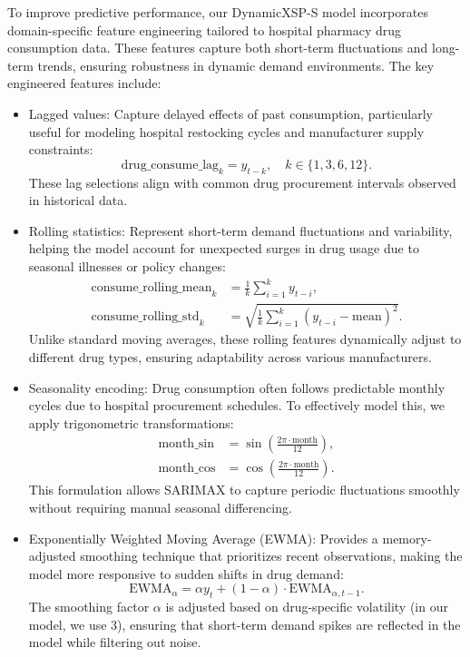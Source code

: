 \documentclass[journal]{IEEEtran}
\begin{document}
To improve predictive performance, our DynamicXSP-S model incorporates domain-specific feature engineering tailored to hospital pharmacy drug consumption data. These features capture both short-term fluctuations and long-term trends, ensuring robustness in dynamic demand environments. The key engineered features include:

\begin{itemize}
    \item Lagged values: Capture delayed effects of past consumption, particularly useful for modeling hospital restocking cycles and manufacturer supply constraints:
    \begin{equation}
    \text{drug\_consume\_lag}_{k} = y_{t-k}, \quad k \in \{1, 3, 6, 12\}.
    \end{equation}
    These lag selections align with common drug procurement intervals observed in historical data.

    \item Rolling statistics: Represent short-term demand fluctuations and variability, helping the model account for unexpected surges in drug usage due to seasonal illnesses or policy changes:
    \begin{align}
    \text{consume\_rolling\_mean}_{k} &= \frac{1}{k} \sum_{i=1}^{k} y_{t-i}, \\
    \text{consume\_rolling\_std}_{k} &= \sqrt{\frac{1}{k} \sum_{i=1}^{k} (y_{t-i} - \text{mean})^2}.
    \end{align}
    Unlike standard moving averages, these rolling features dynamically adjust to different drug types, ensuring adaptability across various manufacturers.

    \item Seasonality encoding: Drug consumption often follows predictable monthly cycles due to hospital procurement schedules. To effectively model this, we apply trigonometric transformations:
    \begin{align}
    \text{month\_sin} &= \sin\left(\frac{2\pi \cdot \text{month}}{12}\right), \\
    \text{month\_cos} &= \cos\left(\frac{2\pi \cdot \text{month}}{12}\right).
    \end{align}
    This formulation allows SARIMAX to capture periodic fluctuations smoothly without requiring manual seasonal differencing.

    \item Exponentially Weighted Moving Average (EWMA): Provides a memory-adjusted smoothing technique that prioritizes recent observations, making the model more responsive to sudden shifts in drug demand:
    \begin{equation}
    \text{EWMA}_{\alpha} = \alpha y_{t} + (1-\alpha) \cdot \text{EWMA}_{\alpha,t-1}.
    \end{equation}
    The smoothing factor \(\alpha\) is adjusted based on drug-specific volatility (in our model, we use 3), ensuring that short-term demand spikes are reflected in the model while filtering out noise.


\end{itemize}
\end{document}
